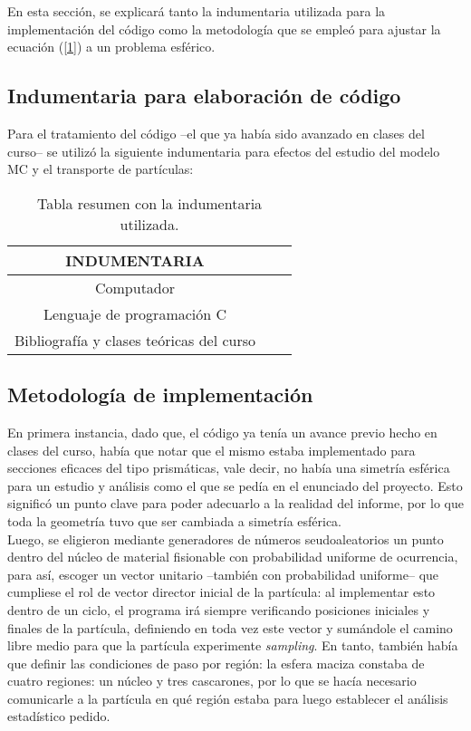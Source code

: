 
En esta sección, se explicará tanto la indumentaria utilizada para la implementación del código como la metodología que se empleó para ajustar la ecuación (\ref{1}) a un problema esférico. 

\subsection{Indumentaria para elaboración de código}
Para el tratamiento del código --el que ya había sido avanzado en clases del curso-- se utilizó la siguiente indumentaria para efectos del estudio del modelo MC y el transporte de partículas:

\begin{table}
	\centering
	\begin{tabular}{|c|c|c|}
		\hline 
		 INDUMENTARIA \\
		\hline
		Computador \\ \hline
		Lenguaje de programación C \\ \hline
		Bibliografía y clases teóricas del curso \\
		\hline 
	\end{tabular} 
	\caption{Tabla resumen con la indumentaria utilizada.}
\end{table} 

\subsection{Metodología de implementación}
En primera instancia, dado que, el código ya tenía un avance previo hecho en clases del curso, había que notar que el mismo estaba implementado para secciones eficaces del tipo prismáticas, vale decir, no había una simetría esférica para un estudio y análisis como el que se pedía en el enunciado del proyecto. Esto significó un punto clave para poder adecuarlo a la realidad del informe, por lo que toda la geometría tuvo que ser cambiada a simetría esférica. \\

Luego, se eligieron mediante generadores de números seudoaleatorios un punto dentro del núcleo de material fisionable con probabilidad uniforme de ocurrencia, para así, escoger un vector unitario --también con probabilidad uniforme-- que cumpliese el rol de vector director inicial de la partícula: al implementar esto dentro de un ciclo, el programa irá siempre verificando posiciones iniciales y finales de la partícula, definiendo en toda vez este vector y sumándole el camino libre medio para que la partícula experimente \emph{sampling}. En tanto, también había que definir las condiciones de paso por región: la esfera maciza constaba de cuatro regiones: un núcleo y tres cascarones, por lo que se hacía necesario comunicarle a la partícula en qué región estaba para luego establecer el análisis estadístico pedido. \\

